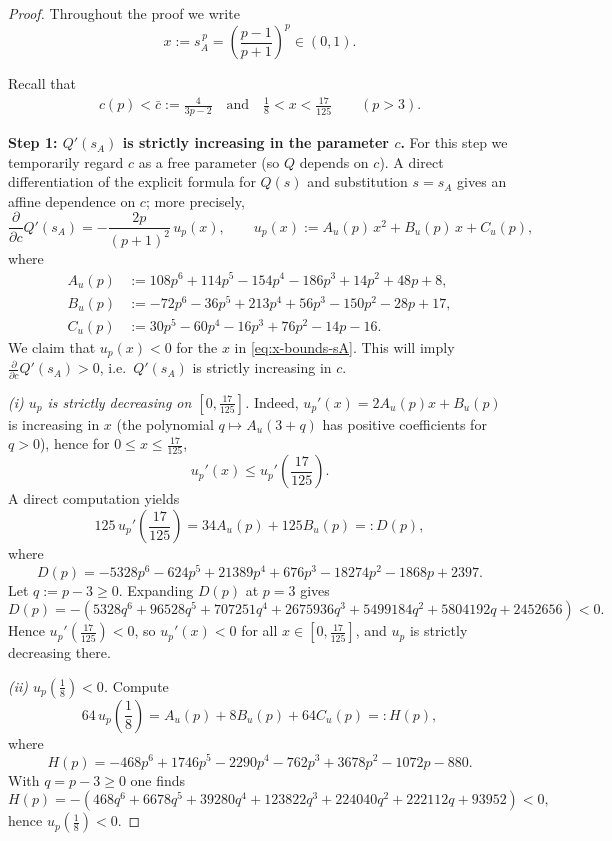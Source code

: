 \documentclass[11pt]{article}
\theoremstyle{definition}
\newcommand{\1}{\mathbf{1}}
\begin{document}
\begin{proof}
Throughout the proof we write
\[
x:=s_A^{\,p}=\left(\frac{p-1}{p+1}\right)^{p}\in(0,1).
\]


Recall that 
\begin{align*}
c(p)<\bar c:=\frac{4}{3p-2} \quad \text{and} \quad \frac18<x<\frac{17}{125}\qquad(p>3).
\end{align*}



\medskip
\noindent\textbf{Step 1: $Q'(s_A)$ is strictly increasing in the parameter $c$.}
For this step we temporarily regard $c$ as a free parameter (so $Q$ depends on $c$).
A direct differentiation of the explicit formula for $Q(s)$ and substitution $s=s_A$
gives an affine dependence on $c$; more precisely,
\begin{equation}\label{eq:dcdc}
\frac{\partial}{\partial c}Q'(s_A)
=-\frac{2p}{(p+1)^2}\,u_p(x),
\qquad
u_p(x):=A_u(p)\,x^2+B_u(p)\,x+C_u(p),
\end{equation}
where
\begin{align*}
A_u(p)&:=108p^6+114p^5-154p^4-186p^3+14p^2+48p+8,\\
B_u(p)&:=-72p^6-36p^5+213p^4+56p^3-150p^2-28p+17,\\
C_u(p)&:=30p^5-60p^4-16p^3+76p^2-14p-16.
\end{align*}
We claim that $u_p(x)<0$ for the $x$ in \eqref{eq:x-bounds-sA}. This will imply
$\frac{\partial}{\partial c}Q'(s_A)>0$, i.e.\ $Q'(s_A)$ is strictly increasing in $c$.

\smallskip
\emph{(i) $u_p$ is strictly decreasing on $[0,\frac{17}{125}]$.}
Indeed, $u_p'(x)=2A_u(p)x+B_u(p)$ is increasing in $x$ (the polynomial $q \mapsto A_{u}(3+q)$ has positive coefficients for $q>0$), hence for $0\le x\le \frac{17}{125}$,
\[
u_p'(x)\le u_p'\!\left(\frac{17}{125}\right).
\]
A direct computation yields
\[
125\,u_p'\!\left(\frac{17}{125}\right)=34A_u(p)+125B_u(p)
=:D(p),
\]
where
\[
D(p)=-5328p^6-624p^5+21389p^4+676p^3-18274p^2-1868p+2397.
\]
Let $q:=p-3\ge0$. Expanding $D(p)$ at $p=3$ gives
\[
D(p)=-(5328q^6+96528q^5+707251q^4+2675936q^3+5499184q^2+5804192q+2452656)<0.
\]
Hence $u_p'\!\left(\frac{17}{125}\right)<0$, so $u_p'(x)<0$ for all $x\in[0,\frac{17}{125}]$,
and $u_p$ is strictly decreasing there.

\smallskip
\emph{(ii) $u_p(\frac18)<0$.}
Compute
\[
64\,u_p\!\left(\frac18\right)=A_u(p)+8B_u(p)+64C_u(p)
=:H(p),
\]
where
\[
H(p)=-468p^6+1746p^5-2290p^4-762p^3+3678p^2-1072p-880.
\]
With $q=p-3\ge0$ one finds
\[
H(p)=-(468q^6+6678q^5+39280q^4+123822q^3+224040q^2+222112q+93952)<0,
\]
hence $u_p(\frac18)<0$.


\end{proof}
\end{document}
